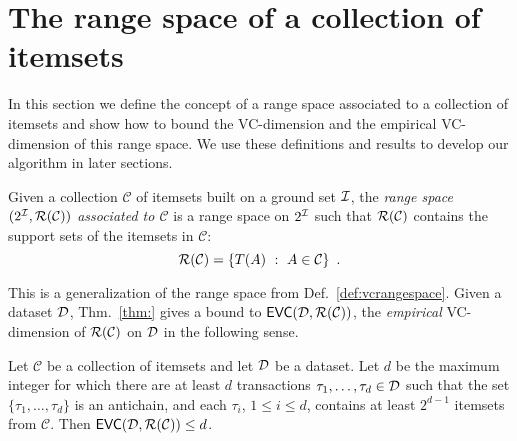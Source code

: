 \section{The range space of a collection of itemsets}\label{sec:range}
In this section we define the concept of a range space associated to a
collection of itemsets and show how to bound the VC-dimension and the
empirical VC-dimension of this range space. We use these definitions and results
to develop our algorithm in later sections.

\begin{definition}\label{def:rangeset}
Given a collection $\mathcal{C}$ of itemsets built on a ground set ${\cal I}$, the
\emph{range space $(2^{\cal I},\mathcal{R}(\mathcal{C}))$ associated to $\mathcal{C}$} is a range
space on $2^{\cal I}$ such that $\mathcal{R}(\mathcal{C})$ contains the support sets of
the itemsets in $\mathcal{C}$:
\[\mathcal{R}(\mathcal{C})=\{T(A) ~:~ A\in\mathcal{C}\}\enspace.\]
\end{definition}
This is a generalization of the range space from Def.~\ref{def:vcrangespace}.
Given a dataset ${\cal D}$, Thm.~\ref{thm:} gives a bound to
$\mathsf{EVC}({\cal D},\mathcal{R}(\mathcal{C}))$, the \emph{empirical} VC-dimension of
$\mathcal{R}(\mathcal{C})$ on ${\cal D}$ in the following sense.


\begin{theorem}\label{lem:evcdimupbound}
  Let $\mathcal{C}$ be a collection of itemsets and let ${\cal D}$ be a dataset. Let
  $d$ be the maximum integer for which there are at least $d$
  transactions $\tau_1,\dotsc,\tau_d\in {\cal D}$ such that the set
  $\{\tau_1,\dotsc,\tau_d\}$ is an antichain, and each $\tau_i$, $1\le i\le d$,
  contains at least $2^{d-1}$ itemsets from $\mathcal{C}$. 
  Then $\mathsf{EVC}({\cal D},\mathcal{R}(\mathcal{C}))\le d$.
\end{theorem}

